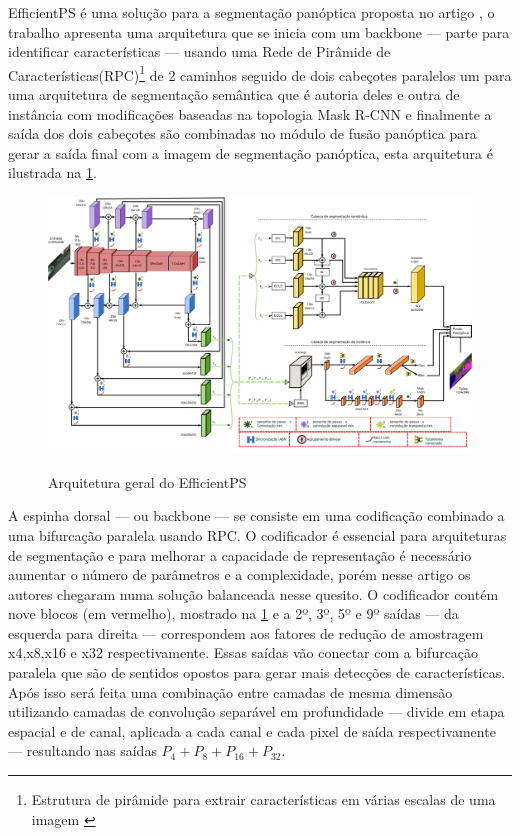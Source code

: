 \label{sec:EfficientPS}

EfficientPS é uma solução para a segmentação panóptica proposta no artigo , o trabalho apresenta uma arquitetura que se inicia com um backbone — parte para identificar características — usando uma Rede de Pirâmide de Características(RPC)\footnote{Estrutura de pirâmide para extrair características em várias escalas de uma imagem \space\cite{piramide}} de 2 caminhos seguido de dois cabeçotes paralelos um para uma arquitetura de segmentação semântica que é autoria deles e outra de instância com modificações baseadas na topologia Mask R-CNN e finalmente a saída dos dois cabeçotes são combinadas no módulo de fusão panóptica para gerar a saída final com a imagem de segmentação panóptica, esta arquitetura é ilustrada na \cref{fig:arqEP}.

\begin{figure}[ht]
	\caption{Arquitetura geral do EfficientPS}
	\centering %
	\includegraphics[width=15cm]{figures/arqEP.png} %
	\label{fig:arqEP}
\end{figure}


A espinha dorsal — ou backbone — se consiste em uma codificação combinado a uma bifurcação paralela usando RPC. O codificador é essencial para arquiteturas de segmentação e para melhorar a capacidade de representação é necessário aumentar o número de parâmetros e a complexidade, porém nesse artigo os autores chegaram numa solução balanceada nesse quesito. O codificador contém nove blocos (em vermelho), mostrado na \cref{fig:arqEP} e a 2º, 3º, 5º e 9º saídas — da esquerda para direita — correspondem aos fatores de redução de amostragem x4,x8,x16 e x32 respectivamente. Essas saídas vão conectar com a bifurcação paralela que são de sentidos opostos para gerar mais detecções de características. Após isso será feita uma combinação entre camadas de mesma dimensão utilizando camadas de convolução separável em profundidade — divide em etapa espacial e de canal, aplicada a cada canal e cada pixel de saída respectivamente — resultando nas saídas $ P_4 + P_8 + P_{16} + P_{32} $\cite{mohan2020efficientps, redes-neurais-convolucionais-separaveis-em-profundidade}.


